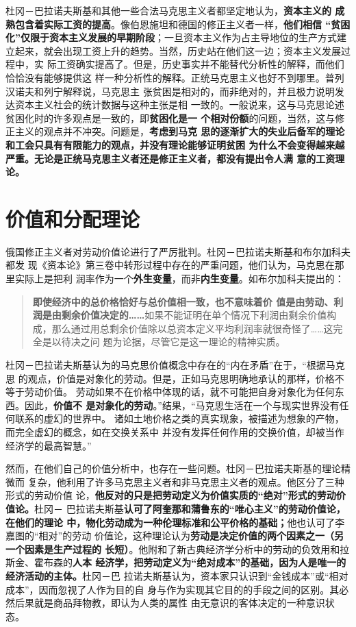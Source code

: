 杜冈－巴拉诺夫斯基和其他一些合法马克思主义者都坚定地认为，\textbf{资本主义的
成熟包含着实际工资的提高}。像伯恩施坦和德国的修正主义者一样，\textbf{他们相信
“贫困化”仅限于资本主义发展的早期阶段}；一旦资本主义作为占主导地位的生产方式建
立起来，就会出现工资上升的趋势。当然，历史站在他们这一边；资本主义发展过程中，实
际工资确实提高了。但是，历史事实并不能替代分析性的解释，而他们恰恰没有能够提供这
样一种分析性的解释。正统马克思主义也好不到哪里。普列汉诺夫和列宁解释说，马克思主
张贫困是相对的，而非绝对的，并且极力说明发达资本主义社会的统计数据与这种主张是相
一致的。一般说来，这与马克思论述贫困化时的许多观点是一致的，即\textbf{贫困化是一
个相对份额}的问题，当然，这与修正主义的观点并不冲突。问题是，\textbf{考虑到马克
思的逐渐扩大的失业后备军的理论和工会只具有有限能力的观点，并没有理论能够证明贫困
为什么不会变得越来越严重。无论是正统马克思主义者还是修正主义者，都没有提出令人满
意的工资理论。}

\section{价值和分配理论}

俄国修正主义者对劳动价值论进行了严厉批判。杜冈－巴拉诺夫斯基和布尔加科夫都发
现《资本论》第三卷中转形过程中存在的严重问题，他们认为，马克思在那里实际上是把利
润率作为一个\textbf{外生变量}，而非\textbf{内生变量}。如布尔加科夫提出的：
\begin{quotation}\textbf{即使经济中的总价格恰好与总价值相一致，也不意味着价
值是由劳动、利润是由剩余价值决定的……}如果不能证明在单个情况下利润由剩余价值构
成，那么通过用总剩余价值除以总资本定义平均利润率就很奇怪了……这完全是以待决之问
题为论据，尽管它是这一理论的精神实质。
\end{quotation}

杜冈－巴拉诺夫斯基认为的马克思价值概念中存在的“内在矛盾”在于，“根据马克思
的观点，价值是对象化的劳动。但是，正如马克思明确地承认的那样，价格不等于劳动价值。
劳动如果不在价格中体现的话，就不可能把自身对象化为任何东西。因此，\textbf{价值不
是对象化的劳动}。”结果，“马克思生活在一个与现实世界没有任何联系的虚幻的世界中。
诸如土地价格之类的真实现象，被描述为想象的产物，而完全虚幻的概念，如在交换关系中
并没有发挥任何作用的交换价值，却被当作经济学的最高智慧。”

然而，在他们自己的价值分析中，也存在一些问题。杜冈－巴拉诺夫斯基的理论精微而
复杂，他利用了许多马克思主义者和非马克思主义者的观点。他区分了三种形式的劳动价值
论，\textbf{他反对的只是把劳动定义为价值实质的“绝对”形式的劳动价值论。}杜冈－
巴拉诺夫斯基\textbf{认可了阿奎那和蒲鲁东的“唯心主义”的劳动价值论，在他们的理论
中，物化劳动成为一种伦理标准和公平价格的基础；}他也认可了李嘉图的“相对”的劳动
价值论，这种理论认为\textbf{劳动是决定价值的两个因素之一（另一个因素是生产过程的
长短）}。他附和了新古典经济学分析中的劳动的负效用和拉斯金、霍布森的\textbf{人本
经济学，把劳动定义为“绝对成本”的基础，因为人是唯一的经济活动的主体。}杜冈－巴
拉诺夫斯基认为，资本家只认识到“金钱成本”或“相对成本”，因而忽视了人作为目的自
身与作为实现其它目的的手段之间的区别。其必然后果就是商品拜物教，即认为人类的属性
由无意识的客体决定的一种意识状态。

